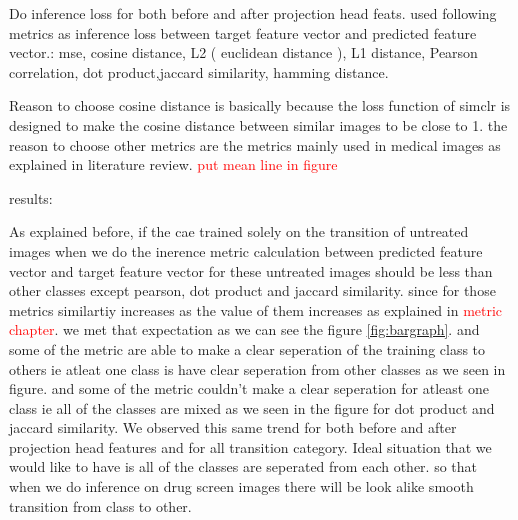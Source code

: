 Do inference loss for both  before and after projection head feats.
used following metrics as inference loss between target feature vector and predicted feature vector.: mse, cosine distance, L2 ( euclidean distance ), L1 distance, Pearson correlation, dot product,jaccard similarity, hamming distance.

Reason to choose cosine distance is basically because the loss function of simclr is designed to make the cosine distance between similar images to be close to 1. the reason to choose other metrics are the metrics mainly used in medical images as explained in literature review.
\textcolor{red}{put mean line in figure}

results:

As explained before, if the cae trained solely on the transition of untreated images when we do the inerence metric calculation between predicted feature vector and target feature vector for these untreated images should be less than other classes  except pearson, dot product and jaccard similarity. since for those metrics similartiy increases as the value of them increases as explained in \textcolor{red}{ metric chapter}. we met that expectation as we can see the figure \ref{fig:bargraph}.  and some of the metric are able to make a clear seperation of the training class to others ie atleat one class is have clear seperation from other classes as we seen in figure. and some of the metric couldn't make a clear seperation for atleast one class ie all of the classes are mixed as we seen in the figure for dot product and jaccard similarity. We observed this same trend  for both before and after projection head features and for all transition category. Ideal situation that we would like to have is all of the classes are seperated from each other. so that when we do inference on drug screen images there will be look alike smooth transition from class to other.

